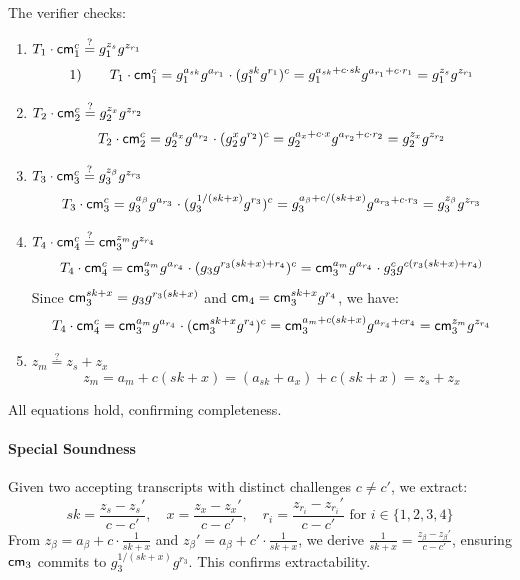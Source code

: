 The verifier checks:
\begin{enumerate}
    \item $T_1 \cdot \mathsf{cm}_1^c \stackrel{?}{=} g_1^{z_{s}} g^{z_{r_1}}$
    \[
    1) \qquad T_1 \cdot \mathsf{cm}_1^c = g_1^{a_{sk}} g^{a_{r_1}} \cdot (g_1^{sk} g^{r_1})^c = g_1^{a_{sk} + c \cdot sk} g^{a_{r_1} + c \cdot r_1} = g_1^{z_{s}} g^{z_{r_1}}
    \]
    \item $T_2 \cdot \mathsf{cm}_2^c \stackrel{?}{=} g_2^{z_x} g^{z_{r_2}}$
    \[
    T_2 \cdot \mathsf{cm}_2^c = g_2^{a_x} g^{a_{r_2}} \cdot (g_2^{x} g^{r_2})^c = g_2^{a_x + c \cdot x} g^{a_{r_2} + c \cdot r_2} = g_2^{z_x} g^{z_{r_2}}
    \]
    \item $T_3 \cdot \mathsf{cm}_3^c \stackrel{?}{=} g_3^{z_{\beta}} g^{z_{r_3}}$
    \[
    T_3 \cdot \mathsf{cm}_3^c = g_3^{a_{\beta}} g^{a_{r_3}} \cdot (g_3^{1/(sk + x)} g^{r_3})^c = g_3^{a_{\beta} + c / (sk + x)} g^{a_{r_3} + c \cdot r_3} = g_3^{z_{\beta}} g^{z_{r_3}}
    \]
    \item $T_4 \cdot \mathsf{cm}_4^c \stackrel{?}{=} \mathsf{cm}_3^{z_m} g^{z_{r_4}}$
    \[
    T_4 \cdot \mathsf{cm}_4^c = \mathsf{cm}_3^{a_m} g^{a_{r_4}} \cdot (g_3 g^{r_3 (sk + x) + r_4})^c = \mathsf{cm}_3^{a_m} g^{a_{r_4}} \cdot g_3^c g^{c (r_3 (sk + x) + r_4)}
    \]
    Since $\mathsf{cm}_3^{sk + x} = g_3 g^{r_3 (sk + x)}$ and $\mathsf{cm}_4 = \mathsf{cm}_3^{sk + x} g^{r_4}$, we have:
    \[
    T_4 \cdot \mathsf{cm}_4^c = \mathsf{cm}_3^{a_m} g^{a_{r_4}} \cdot (\mathsf{cm}_3^{sk + x} g^{r_4})^c = \mathsf{cm}_3^{a_m + c (sk + x)} g^{a_{r_4} + c r_4} = \mathsf{cm}_3^{z_m} g^{z_{r_4}}
    \]
    \item $z_m \stackrel{?}{=} z_{s} + z_x$
    \[
    z_m = a_m + c (sk + x) = (a_{sk} + a_x) + c (sk + x) = z_{s} + z_x
    \]
\end{enumerate}
All equations hold, confirming completeness.

\paragraph{Special Soundness}
Given two accepting transcripts with distinct challenges $c \neq c'$, we extract:
\[
sk = \frac{z_{s} - z_{s}'}{c - c'}, \quad x = \frac{z_x - z_x'}{c - c'}, \quad r_i = \frac{z_{r_i} - z_{r_i}'}{c - c'} \text{ for } i \in \{1,2,3,4\}
\]
From $z_{\beta} = a_{\beta} + c \cdot \frac{1}{sk + x}$ and $z_{\beta}' = a_{\beta} + c' \cdot \frac{1}{sk + x}$, we derive $\frac{1}{sk + x} = \frac{z_{\beta} - z_{\beta}'}{c - c'}$, ensuring $\mathsf{cm}_3$ commits to $g_3^{1/(sk + x)} g^{r_3}$. This confirms extractability.


